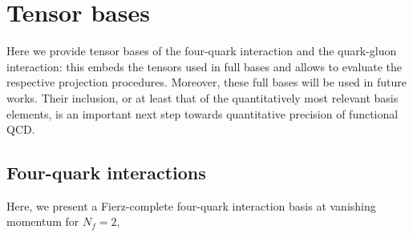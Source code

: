 \documentclass[aps,twocolumn,prd,superscriptaddress]{revtex4-2}
\begin{document}
\section{Tensor bases}
\label{app:TensorBases}

Here we provide tensor bases of the four-quark interaction and the quark-gluon interaction: this embeds the tensors used in full bases and allows to evaluate the respective projection procedures. Moreover, these full bases will be used in future works. 
Their inclusion, or at least that of the quantitatively most relevant basis elements, is an important next step towards quantitative precision of functional QCD.


\subsection{Four-quark interactions}
\label{app:fourQuarkBasis}

Here, we present a Fierz-complete four-quark interaction basis at vanishing momentum for $N_f = 2$,
\end{document}
